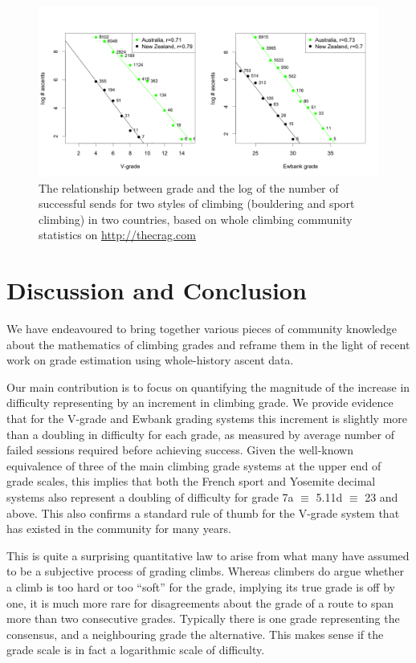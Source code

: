 \documentclass{article}
\begin{document}
\begin{figure}
\centering
\includegraphics[width=\textwidth]{figure1.png}
\caption{\small The relationship between grade and the log of the number of successful sends for two styles of climbing (bouldering and sport climbing) in two countries, based on whole climbing community statistics on \url{http://thecrag.com}}
\label{fig.oneill}
\end{figure}

\section*{Discussion and Conclusion}

We have endeavoured to bring together various pieces of community knowledge about the mathematics of climbing grades and reframe them in the light of recent work on grade estimation using whole-history ascent data.

Our main contribution is to focus on quantifying the magnitude of the increase in difficulty representing by an increment in climbing grade. We provide evidence that for the V-grade and Ewbank grading systems this increment is slightly more than a doubling in difficulty for each grade, as measured by average number of failed sessions required before achieving success. Given the well-known equivalence of three of the main climbing grade systems at the upper end of grade scales, this implies that both the French sport and Yosemite decimal systems also represent a doubling of difficulty for grade 7a $\equiv$ 5.11d $\equiv$ 23 and above. This also confirms a standard rule of thumb for the V-grade system that has existed in the community for many years.

This is quite a surprising quantitative law to arise from what many have assumed to be a subjective process of grading climbs. Whereas climbers do argue whether a climb is too hard or too ``soft'' for the grade, implying its true grade is off by one, it is much more rare for disagreements about the grade of a route to span more than two consecutive grades. Typically there is one grade representing the consensus, and a neighbouring grade the alternative. This makes sense if the grade scale is in fact a logarithmic scale of difficulty.  
\end{document}
